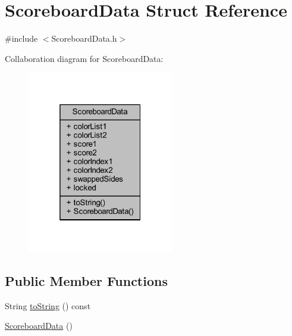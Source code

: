 \hypertarget{struct_scoreboard_data}{}\section{Scoreboard\+Data Struct Reference}
\label{struct_scoreboard_data}


{\ttfamily \#include $<$Scoreboard\+Data.\+h$>$}



Collaboration diagram for Scoreboard\+Data\+:
\nopagebreak
\begin{figure}[H]
\begin{center}
\leavevmode
\includegraphics[width=181pt]{struct_scoreboard_data__coll__graph}
\end{center}
\end{figure}
\subsection*{Public Member Functions}
\begin{DoxyCompactItemize}
\item 
String \hyperlink{struct_scoreboard_data_a1857c6e0cb04be47e30d055458e0fb1b}{to\+String} () const
\item 
\hyperlink{struct_scoreboard_data_acb3b9d9e9affe90ee7575a24a3cf9819}{Scoreboard\+Data} ()
\end{DoxyCompactItemize}
